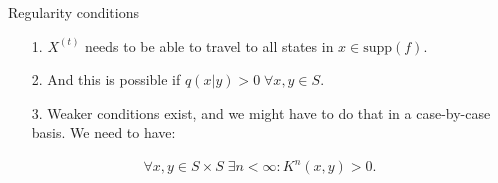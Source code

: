 \documentclass[11pt]{beamer}
\begin{document}
    \begin{frame}{Regularity conditions}
        \begin{itemize}
            \item [1.] $X^{(t)}$ needs to be able to travel to all states in $x\in \text{supp}(f)$. 
            \item [2.] And this is possible if $q(x|y) > 0 \;\forall x, y\in S$. 
            \item [3.] Weaker conditions exist, and we might have to do that in a case-by-case basis. We need to have: 
        \end{itemize}
        \begin{align*}
           \forall x,y \in S\times S \;\exists n < \infty: K^n(x, y) > 0. 
        \end{align*}
    \end{frame}
\end{document}
